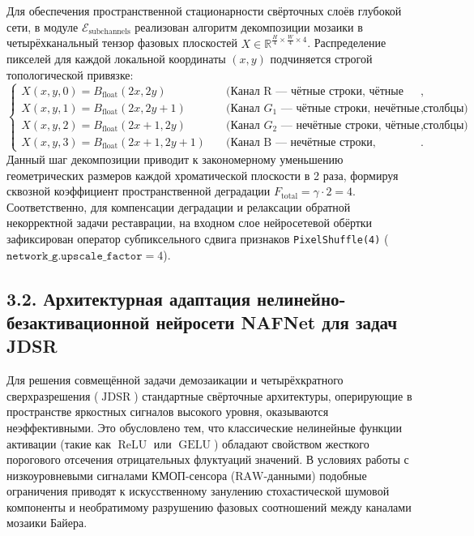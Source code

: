 \documentclass[12pt,a4paper]{article}
\begin{document}
Для обеспечения пространственной стационарности свёрточных слоёв глубокой сети, в модуле $\mathcal{E}_{\operatorname{subchannels}}$ реализован алгоритм декомпозиции мозаики в четырёхканальный тензор фазовых плоскостей $X \in \mathbb{R}^{\frac{H}{4} \times \frac{W}{4} \times 4}$. Распределение пикселей для каждой локальной координаты $(x, y)$ подчиняется строгой топологической привязке:
\begin{equation}
\begin{cases}
X(x, y, 0) = B_{\text{float}}(2x, 2y) \quad &\text{(Канал R --- чётные строки, чётные столбцы)}, \\
X(x, y, 1) = B_{\text{float}}(2x, 2y+1) \quad &\text{(Канал $G_1$ --- чётные строки, нечётные столбцы)}, \\
X(x, y, 2) = B_{\text{float}}(2x+1, 2y) \quad &\text{(Канал $G_2$ --- нечётные строки, чётные столбцы)}, \\
X(x, y, 3) = B_{\text{float}}(2x+1, 2y+1) \quad &\text{(Канал B --- нечётные строки, нечётные столбцы)}.
\end{cases}
\end{equation}
Данный шаг декомпозиции приводит к закономерному уменьшению геометрических размеров каждой хроматической плоскости в 2 раза, формируя сквозной коэффициент пространственной деградации $F_{\operatorname{total}} = \gamma \cdot 2 = 4$. Соответственно, для компенсации деградации и релаксации обратной некорректной задачи реставрации, на входном слое нейросетевой обёртки зафиксирован оператор субпиксельного сдвига признаков \texttt{PixelShuffle(4)} ($\texttt{network\_g.upscale\_factor} = 4$).

\subsection{3.2. Архитектурная адаптация нелинейно-безактивационной нейросети NAFNet для задач JDSR}

Для решения совмещённой задачи демозаикации и четырёхкратного сверхразрешения ($\operatorname{JDSR}$) стандартные свёрточные архитектуры, оперирующие в пространстве яркостных сигналов высокого уровня, оказываются неэффективными. Это обусловлено тем, что классические нелинейные функции активации (такие как $\operatorname{ReLU}$ или $\operatorname{GELU}$) обладают свойством жесткого порогового отсечения отрицательных флуктуаций значений. В условиях работы с низкоуровневыми сигналами КМОП-сенсора ($\text{RAW}$-данными) подобные ограничения приводят к искусственному занулению стохастической шумовой компоненты и необратимому разрушению фазовых соотношений между каналами мозаики Байера. 
\end{document}
